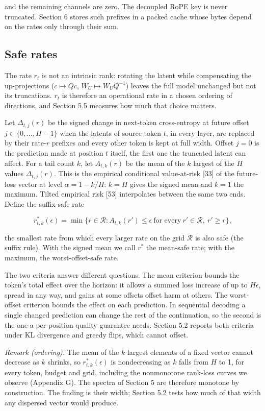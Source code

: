 \documentclass[10pt]{article}
\begin{document}
and the remaining channels are zero. The decoupled RoPE key is never truncated. Section 6 stores such prefixes in a packed cache whose bytes depend on the rates only through their sum.

\subsection{Safe rates}

The rate $r_t$ is not an intrinsic rank: rotating the latent while compensating the up-projections ($c\mapsto Qc$, $W_U\mapsto W_UQ^{-1}$) leaves the full model unchanged but not its truncations. $r_t$ is therefore an operational rate in a chosen ordering of directions, and Section 5.5 measures how much that choice matters.

Let $\Delta_{t,j}(r)$ be the signed change in next-token cross-entropy at future offset $j\in\{0,\ldots,H-1\}$ when the latents of source token $t$, in every layer, are replaced by their rate-$r$ prefixes and every other token is kept at full width. Offset $j=0$ is the prediction made at position $t$ itself, the first one the truncated latent can affect. For a tail count $k$, let $A_{t,k}(r)$ be the mean of the $k$ largest of the $H$ values $\Delta_{t,j}(r)$. This is the empirical conditional value-at-risk [33] of the future-loss vector at level $\alpha=1-k/H$: $k=H$ gives the signed mean and $k=1$ the maximum. Tilted empirical risk [53] interpolates between the same two ends. Define the suffix-safe rate

\[r^*_{t,k}(\epsilon)=\min\{r\in\mathcal R: A_{t,k}(r')\le\epsilon\ \text{for every}\ r'\in\mathcal R,\ r'\ge r\},\]

the smallest rate from which every larger rate on the grid $\mathcal R$ is also safe (the suffix rule). With the signed mean we call $r^*$ the mean-safe rate; with the maximum, the worst-offset-safe rate.

The two criteria answer different questions. The mean criterion bounds the token's total effect over the horizon: it allows a summed loss increase of up to $H\epsilon$, spread in any way, and gains at some offsets offset harm at others. The worst-offset criterion bounds the effect on each prediction. In sequential decoding a single changed prediction can change the rest of the continuation, so the second is the one a per-position quality guarantee needs. Section 5.2 reports both criteria under KL divergence and greedy flips, which cannot offset.

\textit{Remark (ordering).} The mean of the $k$ largest elements of a fixed vector cannot decrease as $k$ shrinks, so $r^*_{t,k}(\epsilon)$ is nondecreasing as $k$ falls from $H$ to 1, for every token, budget and grid, including the nonmonotone rank-loss curves we observe (Appendix G). The spectra of Section 5 are therefore monotone by construction. The finding is their width; Section 5.2 tests how much of that width any dispersed vector would produce.
\end{document}

